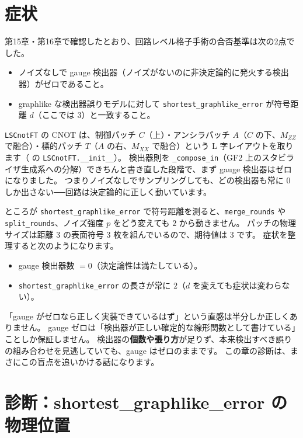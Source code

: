 \section{症状}\label{sec:symptom}

第15章・第16章で確認したとおり、回路レベル格子手術の合否基準は次の2点でした。

\begin{itemize}
  \item ノイズなしで gauge 検出器（ノイズがないのに非決定論的に発火する検出器）がゼロであること。
  \item graphlike な検出器誤りモデルに対して \texttt{shortest\_graphlike\_error} が符号距離 $d$（ここでは $3$）と一致すること。
\end{itemize}

\texttt{LSCnotFT} の CNOT は、制御パッチ $C$（上）・アンシラパッチ $A$（$C$ の下、$M_{ZZ}$ で融合）・標的パッチ $T$（$A$ の右、$M_{XX}$ で融合）という L 字レイアウトを取ります（ の \texttt{LSCnotFT.\_\_init\_\_}）。
検出器則を \texttt{\_compose\_in}（GF2 上のスタビライザ生成系への分解）できちんと書き直した段階で、まず gauge 検出器はゼロになりました。
つまりノイズなしでサンプリングしても、どの検出器も常に $0$ しか出さない──回路は決定論的に正しく動いています。

ところが \texttt{shortest\_graphlike\_error} で符号距離を測ると、\texttt{merge\_rounds} や \texttt{split\_rounds}、ノイズ強度 $p$ をどう変えても $2$ から動きません。
パッチの物理サイズは距離 $3$ の表面符号 3 枚を組んでいるので、期待値は $3$ です。
症状を整理すると次のようになります。

\begin{itemize}
  \item gauge 検出器数 $=0$（決定論性は満たしている）。
  \item \texttt{shortest\_graphlike\_error} の長さが常に $2$（$d$ を変えても症状は変わらない）。
\end{itemize}

「gauge がゼロなら正しく実装できているはず」という直感は半分しか正しくありません。
gauge ゼロは「検出器が正しい確定的な線形関数として書けている」ことしか保証しません。
検出器の\textbf{個数や張り方}が足りず、本来検出すべき誤りの組み合わせを見逃していても、gauge はゼロのままです。
この章の診断は、まさにこの盲点を追いかける話になります。

\section{診断：shortest\_graphlike\_error の物理位置}\label{sec:diagnosis}

